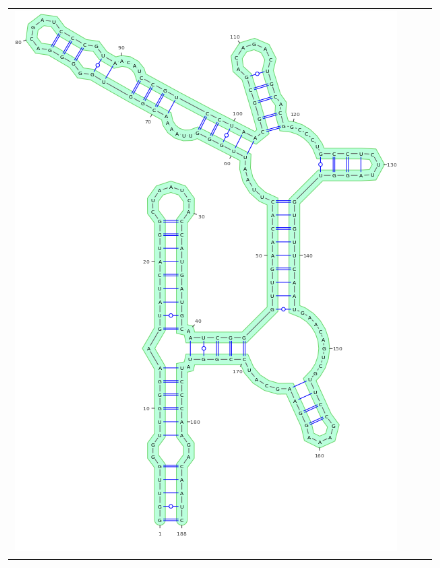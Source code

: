\documentclass[11pt]{article} %
\begin{document}
\begin{figure}[H]
{\begin{adjustbox}{max width=\textwidth,max height=\textheight,keepaspectratio}
\begin{tabular}{@{}ccc@{}}
 \includegraphics[scale=\MyScale]{graphs/Supp_structures/1M7MgCE_NMIAMgCE}
 &

\end{tabular}
\end{adjustbox}}
\end{figure}
\end{document}
